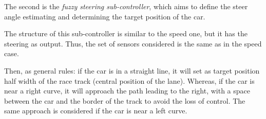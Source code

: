 \documentclass[conference]{IEEEtran}
\begin{document}






The second is the {\em fuzzy steering sub-controller}, which aims to define the steer angle estimating and determining the target position of the car. 

The structure of this sub-controller is similar to the speed one, but it has the steering as output. Thus, the set of sensors considered is the same as in the speed case.

Then, as general rules: if the car is in a straight line, it will set as target position half width of the race track (central position of the lane). Whereas, if the car is near a right curve, it will approach the path leading to the right, with a space between the car and the border of the track to avoid the loss of control. The same approach is considered if the car is near a left curve.
\end{document}

